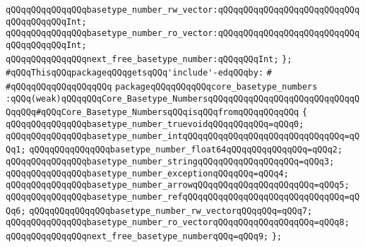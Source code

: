 \verb|qQQqqQQqqQQqqQQqbasetype_number_rw_vector:qQQqqQQqqQQqqQQqqQQqqQQqqQQqqQQqqQQqqQQqInt;|\newline
\verb|qQQqqQQqqQQqqQQqbasetype_number_ro_vector:qQQqqQQqqQQqqQQqqQQqqQQqqQQqqQQqqQQqqQQqInt;|\newline
\newline
\verb|qQQqqQQqqQQqqQQqnext_free_basetype_number:qQQqqQQqInt;|\newline
\verb|};|\newline
\newline
\verb|#qQQqThisqQQqpackageqQQqgetsqQQq'include'-edqQQqby:|\newline
\verb|#|\newline
\verb|#qQQqqQQqqQQqqQQqqQQq|\newline
\newline
\verb|packageqQQqqQQqqQQqcore_basetype_numbers|\newline
\verb|:qQQq(weak)qQQqqQQqCore_Basetype_NumbersqQQqqQQqqQQqqQQqqQQqqQQqqQQqqQQqqQQq#qQQqCore_Basetype_NumbersqQQqisqQQqfromqQQqqQQqqQQq|\newline
\verb|{|\newline
\verb|qQQqqQQqqQQqqQQqbasetype_number_truevoidqQQqqQQqqQQq=qQQq0;|\newline
\verb|qQQqqQQqqQQqqQQqbasetype_number_intqQQqqQQqqQQqqQQqqQQqqQQqqQQqqQQq=qQQq1;|\newline
\verb|qQQqqQQqqQQqqQQqbasetype_number_float64qQQqqQQqqQQqqQQq=qQQq2;|\newline
\verb|qQQqqQQqqQQqqQQqbasetype_number_stringqQQqqQQqqQQqqQQqqQQq=qQQq3;|\newline
\verb|qQQqqQQqqQQqqQQqbasetype_number_exceptionqQQqqQQq=qQQq4;|\newline
\verb|qQQqqQQqqQQqqQQqbasetype_number_arrowqQQqqQQqqQQqqQQqqQQqqQQq=qQQq5;|\newline
\verb|qQQqqQQqqQQqqQQqbasetype_number_refqQQqqQQqqQQqqQQqqQQqqQQqqQQqqQQq=qQQq6;|\newline
\verb|qQQqqQQqqQQqqQQqbasetype_number_rw_vectorqQQqqQQq=qQQq7;|\newline
\verb|qQQqqQQqqQQqqQQqbasetype_number_ro_vectorqQQqqQQqqQQqqQQqqQQq=qQQq8;|\newline
\newline
\verb|qQQqqQQqqQQqqQQqnext_free_basetype_numberqQQq=qQQq9;|\newline
\verb|};|\newline

